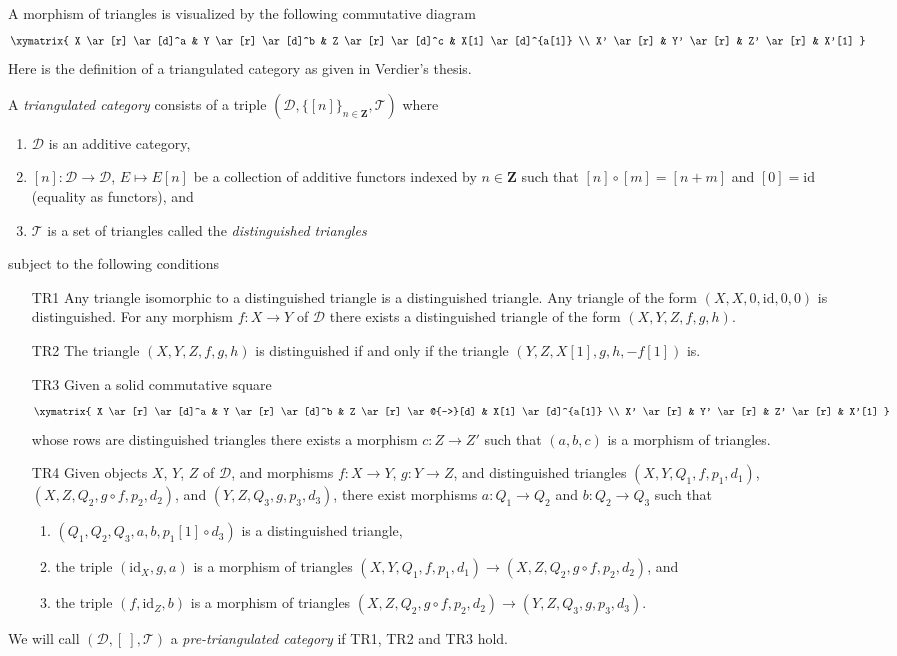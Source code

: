 \noindent
A morphism of triangles is visualized by the following
commutative diagram
$$
\xymatrix{
X \ar[r] \ar[d]^a &
Y \ar[r] \ar[d]^b &
Z \ar[r] \ar[d]^c &
X[1] \ar[d]^{a[1]} \\
X' \ar[r] &
Y' \ar[r] &
Z' \ar[r] &
X'[1]
}
$$
Here is the definition of a triangulated category as given in
Verdier's thesis.

\begin{definition}
\label{definition-triangulated-category}
A {\it triangulated category} consists of a triple
$(\mathcal{D}, \{[n]\}_{n\in \mathbf{Z}}, \mathcal{T})$
where
\begin{enumerate}
\item $\mathcal{D}$ is an additive category,
\item $[n] : \mathcal{D} \to \mathcal{D}$, $E \mapsto E[n]$
be a collection of additive functors indexed by $n \in \mathbf{Z}$ such that
$[n] \circ [m] = [n + m]$ and $[0] = \text{id}$ (equality as functors), and
\item $\mathcal{T}$ is a set of triangles called the
{\it distinguished triangles}
\end{enumerate}
subject to the following conditions
\begin{enumerate}
\item[TR1] Any triangle isomorphic to a distinguished triangle is
a distinguished triangle. Any triangle of the form
$(X, X, 0, \text{id}, 0, 0)$ is distinguished.
For any morphism $f : X \to Y$ of $\mathcal{D}$ there exists a
distinguished triangle of the form $(X, Y, Z, f, g, h)$.
\item[TR2] The triangle $(X, Y, Z, f, g, h)$ is distinguished
if and only if the triangle $(Y, Z, X[1], g, h, -f[1])$ is.
\item[TR3] Given a solid commutative square
$$
\xymatrix{
X \ar[r] \ar[d]^a &
Y \ar[r] \ar[d]^b &
Z \ar[r] \ar@{-->}[d] &
X[1] \ar[d]^{a[1]} \\
X' \ar[r] &
Y' \ar[r] &
Z' \ar[r] &
X'[1]
}
$$
whose rows are distinguished triangles there exists a morphism
$c : Z \to Z'$ such that $(a, b, c)$ is a morphism of triangles.
\item[TR4] Given objects $X$, $Y$, $Z$ of $\mathcal{D}$, and morphisms
$f : X \to Y$, $g : Y \to Z$, and distinguished triangles
$(X, Y, Q_1, f, p_1, d_1)$,
$(X, Z, Q_2, g \circ f, p_2, d_2)$,
and
$(Y, Z, Q_3, g, p_3, d_3)$,
there exist
morphisms $a : Q_1 \to Q_2$ and $b : Q_2 \to Q_3$ such
that
\begin{enumerate}
\item $(Q_1, Q_2, Q_3, a, b, p_1[1] \circ d_3)$ is a
distinguished triangle,
\item the triple $(\text{id}_X, g, a)$ is
a morphism of triangles
$(X, Y, Q_1, f, p_1, d_1) \to (X, Z, Q_2, g \circ f, p_2, d_2)$, and
\item the triple $(f, \text{id}_Z, b)$ is a morphism of triangles
$(X, Z, Q_2, g \circ f, p_2, d_2) \to (Y, Z, Q_3, g, p_3, d_3)$.
\end{enumerate}
\end{enumerate}
We will call $(\mathcal{D}, [\ ], \mathcal{T})$ a
{\it pre-triangulated category} if TR1, TR2 and TR3 hold.
\end{definition}

